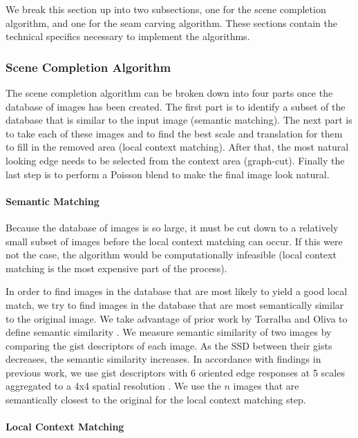 \documentclass[11pt]{amsart}
\begin{document}
We break this section up into two subsections, one for the scene completion algorithm, and one
for the seam carving algorithm. These sections contain the technical specifics necessary to implement 
the algorithms.

\subsubsection{Scene Completion Algorithm}

The scene completion algorithm can be broken down into four parts once the database of images has been created. The first part is to identify a subset of the database that is similar to the input image (semantic matching). The next part is to take each of these images and to find the best scale and translation for them to fill in the removed area (local context matching). After that, the most natural looking edge needs to be selected from the context area (graph-cut). Finally the last step is to perform a Poisson blend to make the final image look natural.

\paragraph{\sc Semantic Matching} 

Because the database of images is so large, it must be cut down to a relatively small subset of images before the local context matching can occur. If this were not the case, the algorithm would be computationally infeasible (local context matching is the most expensive part of the process). 

In order to find images in the database that are most likely to yield a good local match, we try to find images in the database that are most semantically similar to the original image. We take advantage of prior work by Torralba and Oliva to define semantic similarity \cite{Torralba:2006}. We measure semantic similarity of two images by comparing the gist descriptors of each image. As the SSD between their gists decreases, the semantic similarity increases. In accordance with findings in previous work, we use gist descriptors with 6 oriented edge responses at 5 scales aggregated to a
4x4 spatial resolution \cite{Hays:2007}. We use the $n$ images that are semantically closest to the original
for the local context matching step. 

\paragraph{\sc Local Context Matching}
\end{document}
